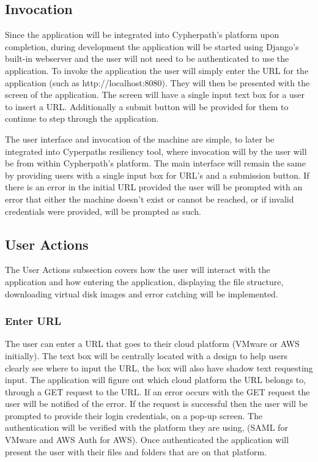 \documentclass{article}
\begin{document}
        \subsection{Invocation}
        Since the application will be integrated into Cypherpath's platform upon completion, during development the application will be started using Django's built-in webserver and
        the user will not need to be authenticated to use the application. To invoke the application the user will simply enter the URL for the application (such as http://localhost:8080).
        They will then be presented with the screen of the application. The screen will have a single input text box for a user to insert a URL. Additionally 
        a submit button will be provided for them to continue to step through the application. 

        The user interface and invocation of the machine are simple, to later be integrated into Cyperpaths resiliency tool, where invocation will by the user will be from within Cypherpath's
        platform. The main interface will remain the same by providing users with a single input box for URL's and a submission button.
        If there is an error in the initial URL provided the user will be prompted with an error that either the machine doesn't exist or cannot be reached, or if invalid credentials 
        were provided, will be prompted as such.

        \subsection{User Actions}
        The User Actions subsection covers how the user will interact with the application and how entering the application, displaying the file structure, downloading virtual disk images and error catching 
        will be implemented.

            \subsubsection{Enter URL}
            The user can enter a URL that goes to their cloud platform (VMware or AWS initially). The text box will be centrally located with a design to help users clearly
            see where to input the URL, the box will also have shadow text requesting input. The application will figure out which cloud platform the URL belongs to, through a GET 
            request to the URL. If an error occurs with the GET request the user will be notified of the error. If the request is successful then the user will be prompted to
            provide their login credentials, on a pop-up screen. The authentication will be verified with the platform they are using, (SAML for VMware and AWS Auth for AWS).
            Once authenticated the application will present the user with their files and folders that are on that platform.
            
\end{document}
